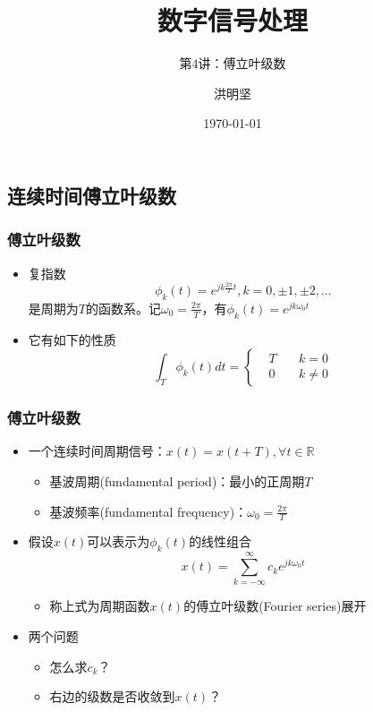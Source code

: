 \documentclass[CJKutf8,xcolor=pdftex,dvipsnames,table]{beamer}
\begin{document}
\begin{CJK*}{UTF8}{song}

  \title{数字信号处理}
  \subtitle{第4讲：傅立叶级数}
  \author{洪明坚}
  \date{\today}


  \frame{\titlepage}
  
  \section{连续时间傅立叶级数}
  
  \begin{frame}
    \frametitle{傅立叶级数}
    \begin{itemize}
    \item 复指数\[ \phi_k(t)=e^{jk\frac{2\pi}{T} t}, k=0, \pm1 , \pm2, \hdots \]是周期为$T$的函数系。记$\omega_0=\frac{2\pi}{T}$，有$\phi_k(t)=e^{jk\omega_0 t}$
	\item 它有如下的性质 
	\[
\int_T \phi_k(t)dt = 
\left\{
    \begin {aligned}
         & T \quad & k = 0 \\
         & 0 \quad & k \neq 0                 
    \end{aligned}
\right.
	\]

    \end{itemize}      
  \end{frame}  

  \begin{frame}
    \frametitle{傅立叶级数}
    \begin{itemize}
    \item 一个连续时间周期信号：$x(t)=x(t+T), \forall t \in \mathbb{R}$
        \begin{itemize}
        \item 基波周期(fundamental period)：最小的正周期$T$
        \item 基波频率(fundamental frequency)：$\omega_0=\frac{2\pi}{T}$  
        \end{itemize}  
    \item 假设$x(t)$可以表示为$\phi_k(t)$的线性组合
    \[ 
    x(t)=\sum_{k=-\infty}^{\infty}c_k e^{jk\omega_0 t} 
    \]
	    \begin{itemize}
    	\item 称上式为周期函数$x(t)$的傅立叶级数(Fourier series)展开    
	    \end{itemize}
    \item 两个问题
    	\begin{itemize}
		\item 怎么求$c_k$？
		\item 右边的级数是否收敛到$x(t)$？
		\end{itemize}
    \end{itemize}      
  \end{frame}  
  

\end{CJK*}
\end{document}
